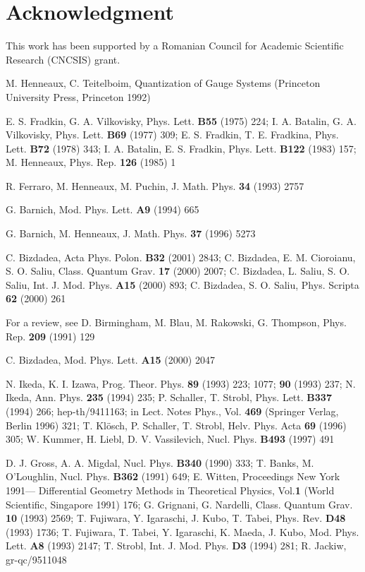 \documentclass[a4paper,12pt]{article}
\begin{document}
\section*{Acknowledgment}

This work has been supported by a Romanian Council for Academic Scientific
Research (CNCSIS) grant.

\begin{thebibliography}{99}
  M. Henneaux, C. Teitelboim, Quantization of Gauge Systems
(Princeton University Press, Princeton 1992)

  E. S. Fradkin, G. A. Vilkovisky, Phys. Lett. \textbf{B55}
(1975) 224; I. A. Batalin, G. A. Vilkovisky, Phys. Lett. \textbf{B69} (1977)
309; E. S. Fradkin, T. E. Fradkina, Phys. Lett. \textbf{B72} (1978) 343; I.
A. Batalin, E. S. Fradkin, Phys. Lett. \textbf{B122} (1983) 157; M.
Henneaux, Phys. Rep. \textbf{126} (1985) 1

  R. Ferraro, M. Henneaux, M. Puchin, J. Math. Phys. \textbf{34}
(1993) 2757

  G. Barnich, Mod. Phys. Lett. \textbf{A9} (1994) 665

  G. Barnich, M. Henneaux, J. Math. Phys. \textbf{37} (1996) 5273

  C. Bizdadea, Acta Phys. Polon. \textbf{B32} (2001) 2843;
C. Bizdadea, E. M. Cioroianu, S. O. Saliu, Class. Quantum Grav. 
\textbf{17} (2000) 2007; C. Bizdadea, L. Saliu, S. O. Saliu, 
Int. J. Mod. Phys. \textbf{A15} (2000) 893; C. Bizdadea,
S. O. Saliu, Phys. Scripta \textbf{62} (2000) 261

  For a review, see D. Birmingham, M. Blau, M. Rakowski, G.
Thompson, Phys. Rep. \textbf{209} (1991) 129

  C. Bizdadea, Mod. Phys. Lett. \textbf{A15} (2000) 2047

  N. Ikeda, K. I. Izawa, Prog. Theor. Phys. \textbf{89} (1993)
223; 1077; \textbf{90} (1993) 237; N. Ikeda, Ann. Phys. \textbf{235} (1994)
235; P. Schaller, T. Strobl, Phys. Lett. \textbf{B337} (1994) 266;
hep-th/9411163; in Lect. Notes Phys., Vol. \textbf{469} (Springer Verlag,
Berlin 1996) 321; T. Kl\"{o}sch, P. Schaller, T. Strobl, Helv. Phys. Acta 
\textbf{69} (1996) 305; W. Kummer, H. Liebl, D. V. Vassilevich, Nucl. Phys. 
\textbf{B493} (1997) 491

  D. J. Gross, A. A. Migdal, Nucl. Phys. \textbf{B340} (1990)
333; T. Banks, M. O'Loughlin, Nucl. Phys. \textbf{B362} (1991) 649; E.
Witten, Proceedings New York 1991--- Differential Geometry Methods in
Theoretical Physics, Vol.\textbf{1} (World Scientific, Singapore 1991) 176;
G. Grignani, G. Nardelli, Class. Quantum Grav. \textbf{10} (1993) 2569; T.
Fujiwara, Y. Igaraschi, J. Kubo, T. Tabei, Phys. Rev. \textbf{D48} (1993)
1736; T. Fujiwara, T. Tabei, Y. Igaraschi, K. Maeda, J. Kubo, Mod. Phys.
Lett. \textbf{A8} (1993) 2147; T. Strobl, Int. J. Mod. Phys. \textbf{D3}
(1994) 281; R. Jackiw, gr-qc/9511048


\end{thebibliography}
\end{document}
